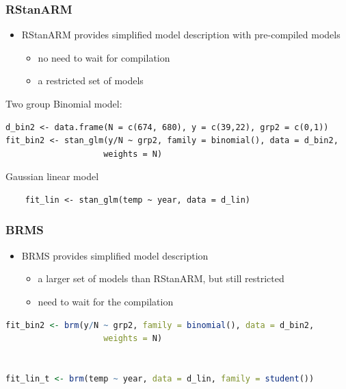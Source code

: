 \documentclass[10pt,handout]{beamer}
\begin{document}
\begin{frame}[fragile]

\frametitle{RStanARM}

  \begin{itemize}
  \item RStanARM provides simplified model description with
    pre-compiled models
    \begin{itemize}
    \item no need to wait for compilation
    \item a restricted set of models
    \end{itemize}
  \end{itemize}

Two group Binomial model:
  {\scriptsize
\begin{lstlisting}
d_bin2 <- data.frame(N = c(674, 680), y = c(39,22), grp2 = c(0,1))
fit_bin2 <- stan_glm(y/N ~ grp2, family = binomial(), data = d_bin2,
                    weights = N)
\end{lstlisting}
  }
    Gaussian linear model
  {\scriptsize
\begin{lstlisting}
    fit_lin <- stan_glm(temp ~ year, data = d_lin)
\end{lstlisting}
  }


\end{frame}


\begin{frame}[fragile]

\frametitle{BRMS}

  \begin{itemize}
  \item BRMS provides simplified model description
    \begin{itemize}
    \item a larger set of models than RStanARM, but still restricted
    \item need to wait for the compilation
    \end{itemize}
  \end{itemize}

  {\scriptsize
\begin{lstlisting}[language=R]
fit_bin2 <- brm(y/N ~ grp2, family = binomial(), data = d_bin2,
                    weights = N)


fit_lin_t <- brm(temp ~ year, data = d_lin, family = student())
\end{lstlisting}
    }

\end{frame}
\end{document}
